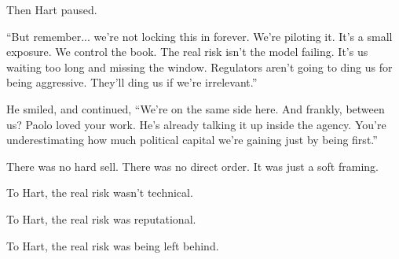 Then Hart paused.

``But remember... we’re not locking this in forever. We’re piloting it. It's a small exposure. We control the book. The real 
risk isn’t the model failing. It’s us waiting too long and missing the window. Regulators aren’t going to ding us for being 
aggressive. They’ll ding us if we’re irrelevant.''

He smiled, and continued, ``We’re on the same side here. And frankly, between us? Paolo loved your work. He’s already 
talking it up inside the agency. You’re underestimating how much political capital we’re gaining just by being first.''

There was no hard sell. There was no direct order.  It was just a soft framing.  

To Hart, the real risk wasn’t technical.  

To Hart, the real risk was reputational.  

To Hart, the real risk was being left behind.

